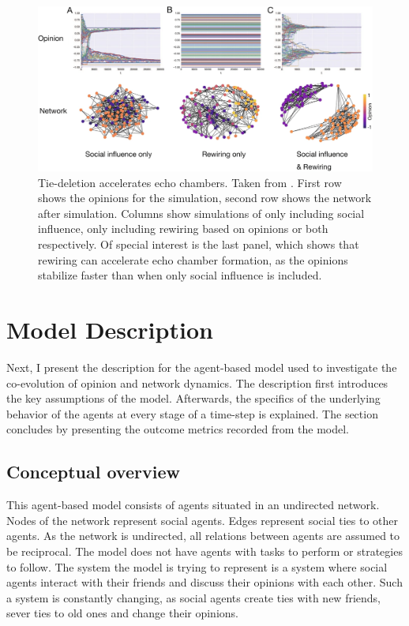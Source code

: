\documentclass{article}
\begin{document}
\begin{figure}[H]
    \centering
    \includegraphics[width=.8\linewidth]{../plots/references/echo_chambers.png}
  \caption{Tie-deletion accelerates echo chambers. Taken from \protect\citeauthor{sasahara_social_2021} \protect\citeyear{sasahara_social_2021}. First row shows the opinions for the simulation, second row shows the network after simulation. Columns show simulations of only including social influence, only including rewiring based on opinions or both respectively. Of special interest is the last panel, which shows that rewiring can accelerate echo chamber formation, as the opinions stabilize faster than when only social influence is included.}
  \label{fig:echo_chambers}
\end{figure}

\section{Model Description}
Next, I present the description for the agent-based model used to investigate the co-evolution of opinion and network dynamics. 
The description first introduces the key assumptions of the model. Afterwards, the specifics of the underlying behavior of the agents at every stage of a time-step is explained. The section concludes by presenting the outcome metrics recorded from the model.

\subsection{Conceptual overview}
This agent-based model consists of agents situated in an undirected network. Nodes of the network represent social agents. Edges represent social ties to other agents. As the network is undirected, all relations between agents are assumed to be reciprocal.
The model does not have agents with tasks to perform or strategies to follow. The system the model is trying to represent is a system where social agents interact with their friends and discuss their opinions with each other. Such a system is constantly changing, as social agents create ties with new friends, sever ties to old ones and change their opinions. 
\end{document}
